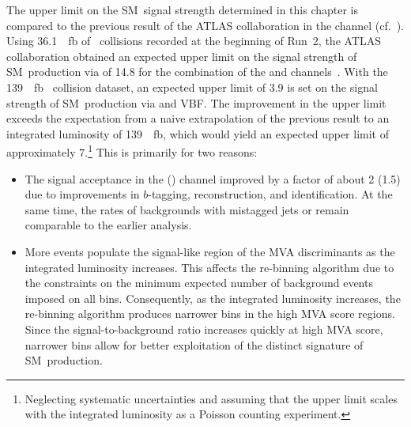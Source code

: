 The upper limit on the SM~\HH signal strength determined in this chapter is
compared to the previous result of the ATLAS collaboration in the \bbtautau
channel (cf.~). Using \SI{36.1}{\per\femto\barn}
of \pp~collisions recorded at the beginning of Run~2, the ATLAS collaboration
obtained an expected upper limit on the signal strength of SM~\HH production via
\ggF of 14.8 for the combination of the \lephad and \hadhad
channels~\cite{HIGG-2016-16-witherratum}. With the \SI{139}{\per\femto\barn}
\pp~collision dataset, an expected upper limit of 3.9 is set on the signal
strength of SM~\HH production via \ggF and VBF. The improvement in the upper
limit exceeds the expectation from a naive extrapolation of the previous result
to an integrated luminosity of \SI{139}{\per\femto\barn}, which would yield an
expected upper limit of approximately 7.\footnote{Neglecting systematic
  uncertainties and assuming that the upper limit scales with the integrated
  luminosity as a Poisson counting experiment.} This is primarily for two
reasons:
\begin{itemize}

\item The signal acceptance in the \hadhad (\lephad) channel improved by a
  factor of about 2 (1.5) due to improvements in $b$-tagging, \tauhadvis
  reconstruction, and \tauhadvis identification. At the same time, the rates of
  backgrounds with mistagged jets or \faketauhadvis remain comparable to the
  earlier analysis.

\item More events populate the signal-like region of the MVA discriminants as
  the integrated luminosity increases. This affects the re-binning algorithm due
  to the constraints on the minimum expected number of background events imposed
  on all bins. Consequently, as the integrated luminosity increases, the
  re-binning algorithm produces narrower bins in the high MVA score
  regions. Since the signal-to-background ratio increases quickly at high MVA
  score, narrower bins allow for better exploitation of the distinct signature
  of SM~\HH production.

\end{itemize}

